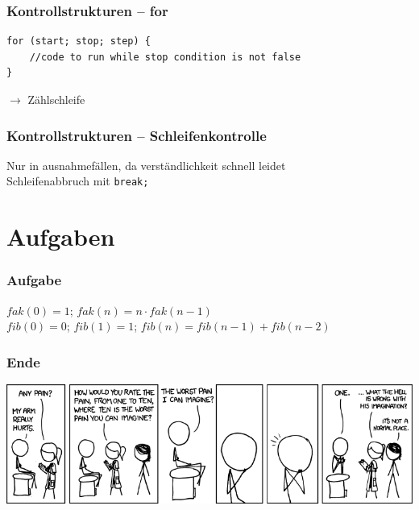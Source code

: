 \documentclass{beamer}
\begin{document}
\begin{frame}[fragile]
\frametitle{Kontrollstrukturen -- for}
\begin{verbatim}
for (start; stop; step) {
    //code to run while stop condition is not false
}
\end{verbatim}
$\rightarrow$ Z\"{a}hlschleife
\end{frame}

\begin{frame}[fragile]
\frametitle{Kontrollstrukturen -- Schleifenkontrolle}
Nur in ausnahmef\"{a}llen, da verst\"{a}ndlichkeit schnell leidet\\
Schleifenabbruch mit \verb|break;|
\end{frame}

\section{Aufgaben}
\begin{frame}
\frametitle{Aufgabe}
$fak(0)=1$; $fak(n) = n\cdot{}fak(n-1)$\\
$fib(0)=0$; $fib(1)=1$; $fib(n)=fib(n-1)+fib(n-2)$
\end{frame}

\begin{frame}
\frametitle{Ende}
\includegraphics[scale=0.4]{pain_rating.png}
\end{frame}
\end{document}
